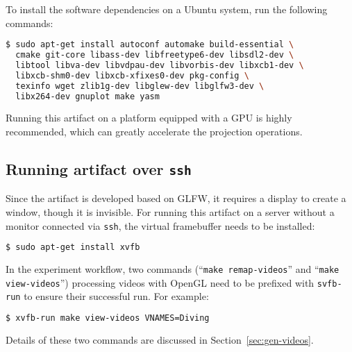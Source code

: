 To install the software dependencies on a Ubuntu system, run the following commands:
\begin{lstlisting}[language=bash, numbers=none, morekeywords={sudo, apt,-,get, install}, deletekeywords={enable}]
$ sudo apt-get install autoconf automake build-essential \
  cmake git-core libass-dev libfreetype6-dev libsdl2-dev \
  libtool libva-dev libvdpau-dev libvorbis-dev libxcb1-dev \
  libxcb-shm0-dev libxcb-xfixes0-dev pkg-config \
  texinfo wget zlib1g-dev libglew-dev libglfw3-dev \
  libx264-dev gnuplot make yasm
\end{lstlisting}

\noindent{\bf Hardware dependencies:} Running this artifact on a platform equipped with a GPU is highly recommended,
which can greatly accelerate the projection operations.

\subsection{Running artifact over {\tt ssh}}
Since the artifact is developed based on GLFW, it requires a display to create a window, though it is invisible. For
running this artifact on a server  without a monitor connected via {\tt ssh}, the virtual framebuffer needs to be
installed:
\begin{lstlisting}[language=bash, numbers=none, morekeywords={sudo, apt, -, get, install}, deletekeywords={enable}]
$ sudo apt-get install xvfb
\end{lstlisting}
In the experiment workflow, two commands (``{\tt make remap-videos}'' and ``{\tt make view-videos}'') processing videos with
OpenGL need to be prefixed with {\tt svfb-run} to ensure their successful run. For example:
\begin{lstlisting}[language=bash, numbers=none, deletekeywords={enable},  morekeywords={make, git, clone, xvfb, -, run}]
$ xvfb-run make view-videos VNAMES=Diving
\end{lstlisting}
Details of these two commands are discussed in Section~\ref{sec:gen-videos}.


